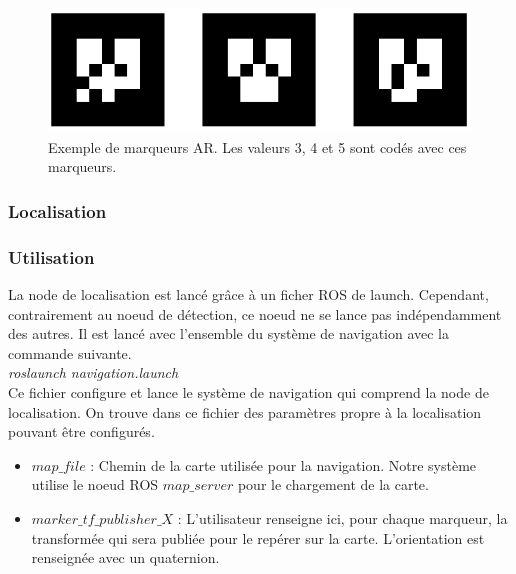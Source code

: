 \documentclass[10pt,a4paper]{article}
\begin{document}
\begin{figure}
\center
\includegraphics[scale=0.6]{figures/artags.png} 
\caption{Exemple de marqueurs AR. Les valeurs 3, 4 et 5 sont codés avec ces marqueurs.}	
\end{figure}


\subsubsection{Localisation}
\label{sec:localision}

\subsubsection*{Utilisation}
La node de localisation est lancé gr\^ace à un ficher ROS de launch. Cependant, contrairement au noeud de détection, ce noeud ne se lance pas indépendamment des autres. Il est lancé avec l'ensemble du système de navigation avec la commande suivante.\\
\textit{roslaunch navigation.launch}\\

Ce fichier configure et lance le système de navigation qui comprend la node de localisation. 
On trouve dans ce fichier des paramètres propre à la localisation pouvant être configurés.

\begin{itemize}
\item $map\_file$ : Chemin de la carte utilisée pour la navigation. Notre système utilise le noeud ROS $map\_server$ pour le chargement de la carte.
\item $marker\_tf\_publisher\_X$ : L'utilisateur renseigne ici, pour chaque marqueur, la transformée qui sera publiée pour le repérer sur la carte. L'orientation est renseignée avec un quaternion. \\
\end{itemize}
\end{document}
